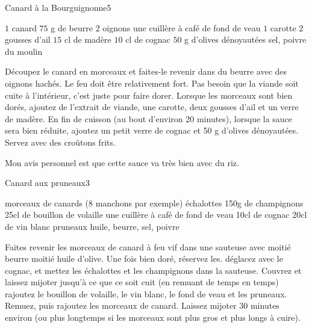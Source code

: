 \begin{recette}{Canard à la Bourguignonne}{5}{}{}

\begin{ingredients}
\ingredient $1$ canard
\ingredient $75$ g de beurre
\ingredient $2$ oignons
\ingredient une cuillère à café de fond de veau
\ingredient $1$ carotte
\ingredient $2$ gousses d'ail
\ingredient $15$ cl de madère
\ingredient $10$ cl de cognac
\ingredient $50$ g d'olives dénoyautées
\ingredient sel, poivre du moulin
\end{ingredients}

\begin{preparation}
\etape Découpez le canard en morceaux et faites-le revenir dans du beurre avec des oignons hachés. Le feu doit être relativement fort. Pas besoin que la viande soit cuite à l'intérieur, c'est juste pour faire dorer.
\etape Lorsque les morceaux sont bien dorés, ajoutez de l'extrait de viande, une carotte, deux gousses d'ail et un verre de madère.
\etape En fin de cuisson (au bout d'environ 20 minutes), lorsque la sauce sera bien réduite, ajoutez un petit verre de cognac et 50 g d'olives dénoyautées.
\etape Servez avec des croûtons frits.
\end{preparation}

\begin{remarque}
Mon avis personnel est que cette sauce va très bien avec du riz.
\end{remarque}

\end{recette}

\begin{recette}{Canard aux pruneaux}{3}{}{}
\begin{ingredients}
\ingredient morceaux de canards (8 manchons par exemple)
 échalottes
\ingredient 150g de champignons
\ingredient 25cl de bouillon de volaille
\ingredient une cuillère à café de fond de veau
\ingredient 10cl de cognac
\ingredient 20cl de vin blanc
\ingredient pruneaux
\ingredient huile, beurre, sel, poivre
\end{ingredients}

\begin{preparation}
\etape Faites revenir les morceaux de canard à feu vif dans une sauteuse avec moitié beurre moitié huile d'olive. Une fois bien doré, réservez les.
\etape déglacez avec le cognac, et mettez les échalottes et les champignons dans la sauteuse. Couvrez et laissez mijoter jusqu'à ce que ce soit cuit (en remuant de temps en temps)
\etape rajoutez le bouillon de volaille, le vin blanc, le fond de veau et les pruneaux. Remuez, puis rajoutez les morceaux de canard.
\etape Laissez mijoter 30 minutes environ (ou plus longtemps si les morceaux sont plus gros et plus longs à cuire).
\end{preparation}

\end{recette}

